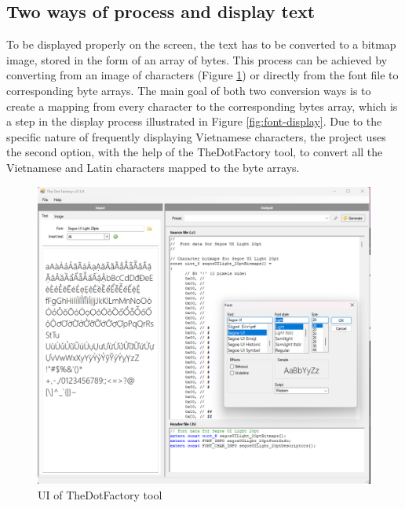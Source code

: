 \documentclass[../Main.tex]{subfiles}
\begin{document}
\subsection{Two ways of process and display text}
\label{2-ways-process}
To be displayed properly on the screen, the text has to be converted to a bitmap image, stored in the form of an array of bytes. This process can be achieved by converting from an image of characters (Figure \ref{fig:thedotfactory}) or directly from the font file to corresponding byte arrays. The main goal of both two conversion ways is to create a mapping from every character to the corresponding bytes array, which is a step in the display process illustrated in Figure \ref{fig:font-display}. Due to the specific nature of frequently displaying Vietnamese characters, the project uses the second option, with the help of the TheDotFactory tool, to convert all the Vietnamese and Latin characters mapped to the byte arrays.
\begin{figure}[h]
    \centering
    \includegraphics[width=0.8\linewidth]{doc/imgs/thedotfactory.png}
    \caption{UI of TheDotFactory tool}
    \label{fig:thedotfactory}
\end{figure}
\end{document}
